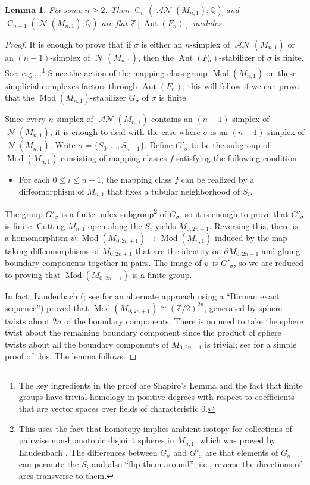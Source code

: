\documentclass[11pt]{amsart}
\numberwithin{equation}{section}
\theoremstyle{plain}
\newtheorem{lemma}[theorem]{Lemma}
\theoremstyle{definition}
\theoremstyle{remark}
\newcommand\Z{\ensuremath{\mathbb{Z}}}
\newcommand\Q{\ensuremath{\mathbb{Q}}}
\DeclareMathOperator{\CC}{C}
\DeclareMathOperator{\Aut}{Aut}
\DeclareMathOperator{\Mod}{Mod}
\DeclareMathOperator{\NSpheres}{\mathcal{N}}
\DeclareMathOperator{\ANSpheres}{\mathcal{AN}}
\begin{document}
\begin{lemma}
\label{lemma:flatness}
Fix some $n \geq 2$.  Then $\CC_n(\ANSpheres(M_{n,1});\Q)$ and $\CC_{n-1}(\NSpheres(M_{n,1});\Q)$ are
flat $\Z[\Aut(F_n)]$-modules.
\end{lemma}
\begin{proof}
It is enough to prove that if $\sigma$ is either an $n$-simplex of $\ANSpheres(M_{n,1})$ or an $(n-1)$-simplex
of $\NSpheres(M_{n,1})$, then the $\Aut(F_n)$-stabilizer of $\sigma$ is finite.  See, e.g., \cite[Lemma 3.2]{ChurchFarbPutmanVanish}.\footnote{The key
ingredients in the proof are Shapiro's Lemma and the fact that finite groups have trivial homology in positive degrees with respect
to coefficients that are vector spaces over fields of characteristic $0$.}  Since the action of
the mapping class group $\Mod(M_{n,1})$ on these simplicial complexes factors through $\Aut(F_n)$, this
will follow if we can prove that the $\Mod(M_{n,1})$-stabilizer $G_{\sigma}$ of $\sigma$ is finite.

Since every $n$-simplex of $\ANSpheres(M_{n,1})$ contains an $(n-1)$-simplex of $\NSpheres(M_{n,1})$, it
is enough to deal with the case where $\sigma$ is an $(n-1)$-simplex of $\NSpheres(M_{n,1})$.  Write
$\sigma = \{S_0,\ldots,S_{n-1}\}$.  Define $G'_{\sigma}$ to be the subgroup of $\Mod(M_{n,1})$ consisting
of mapping classes $f$ satisfying the following condition:
\begin{itemize}
\item For each $0 \leq i \leq n-1$, the mapping class $f$ can be realized by a diffeomorphism of $M_{n,1}$ that
fixes a tubular neighborhood of $S_i$.
\end{itemize}
The group $G'_{\sigma}$ is a finite-index subgroup\footnote{This uses the fact that homotopy implies ambient isotopy for
collections of pairwise non-homotopic disjoint spheres in $M_{n,1}$, which was proved by Laudenbach \cite{LaudenbachPaper, LaudenbachBook}.
The differences between $G_{\sigma}$ and $G'_{\sigma}$ are that
elements of $G_{\sigma}$ can permute the $S_i$ and also ``flip them around'', i.e., reverse the directions of arcs
transverse to them.} of $G_{\sigma}$, so it is enough to prove that $G'_{\sigma}$ is finite.  Cutting $M_{n,1}$ open
along the $S_i$ yields $M_{0,2n+1}$.  Reversing this, there is a homomorphism $\psi\colon \Mod(M_{0,2n+1}) \rightarrow \Mod(M_{n,1})$
induced by the map taking diffeomorphisms of $M_{0,2n+1}$ that are the identity on $\partial M_{0,2n+1}$ and gluing boundary
components together in pairs.  The image of $\psi$ is $G'_{\sigma}$, so we are reduced to proving that $\Mod(M_{0,2n+1})$
is a finite group.  

In fact, Laudenbach (\cite{LaudenbachPaper, LaudenbachBook}; see \cite{Landgraf} for an alternate approach using a
``Birman exact sequence'') proved that $\Mod(M_{0,2n+1}) \cong (\Z/2)^{2n}$, generated by sphere twists about $2n$ of
the boundary components.  There is no need to take the sphere twist about the remaining boundary component since the product
of sphere twists about all the boundary components of $M_{0,2n+1}$ is trivial; see \cite[p.\ 214--215]{HatcherWahl3Manifolds} for
a simple proof of this.  The lemma follows.
\end{proof}
\end{document}
